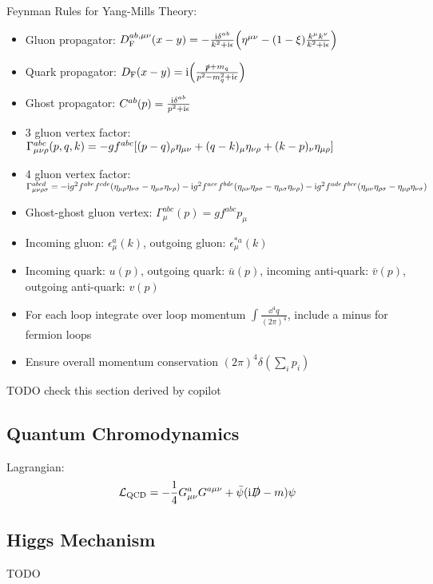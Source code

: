 		\noindent
		Feynman Rules for Yang-Mills Theory:
		\begin{itemize}\itemsep -0pt
			\item Gluon propagator: $D_\text{F}^{ab,\mu\nu}(x-y) = -\frac{\mathrm{i} \delta^{ab}}{k^2+\mathrm{i}\epsilon} \qty(\eta^{\mu\nu}-(1-\xi)\frac{k^\mu k^\nu}{k^2+\mathrm{i}\epsilon} )$
			\item Quark propagator: $D_\text{F}(x-y) = \mathrm{i}\qty(\frac{\slashed{p}+m_q}{p^2-m_q^2+\mathrm{i}\epsilon})$
			\item Ghost propagator: $C^{ab}(p) = \frac{\mathrm{i}\delta^{ab}}{p^2+\mathrm{i}\epsilon}$
			\item 3 gluon vertex factor: $\Gamma^{abc}_{\mu\nu\rho}(p,q,k) = -gf^{abc} \qty[(p-q)_\rho \eta_{\mu\nu} + (q-k)_\mu \eta_{\nu\rho} + (k-p)_\nu \eta_{\mu\rho}]$
			\item 4 gluon vertex factor: $\Gamma^{abcd}_{\mu\nu\rho\sigma} = -\mathrm{i} g^2 f^{abe}f^{cde}(\eta_{\mu\rho}\eta_{\nu\sigma} - \eta_{\mu\sigma}\eta_{\nu\rho}) - \mathrm{i} g^2 f^{ace}f^{bde} (\eta_{\mu\nu}\eta_{\rho\sigma} - \eta_{\mu\sigma}\eta_{\nu\rho}) - \mathrm{i} g^2 f^{ade} f^{bce} (\eta_{\mu\nu}\eta_{\rho\sigma} - \eta_{\mu\rho}\eta_{\nu\sigma})$
			\item Ghost-ghost gluon vertex: $\Gamma^{abc}_\mu(p) = gf^{abc} p_\mu$
			\item Incoming gluon: $\epsilon^a_\mu(k)$, outgoing gluon: $\epsilon^{*a}_\mu(k)$
			\item Incoming quark: $u(p)$, outgoing quark: $\bar{u}(p)$, incoming anti-quark: $\bar{v}(p)$, outgoing anti-quark: $v(p)$
			\item For each loop integrate over loop momentum $\int \frac{\dd^4 q}{(2\pi)^4}$, include a minus for fermion loops
			\item Ensure overall momentum conservation $(2\pi)^4 \delta(\sum_i p_i)$
		\end{itemize}
		
		TODO check this section derived by copilot
	
	\subsection{Quantum Chromodynamics} 
		Lagrangian:
		\begin{equation}
			\mathcal{L}_\text{QCD} = -\frac{1}{4} G^a_{\mu\nu} G^{a\mu\nu} + \bar{\psi}(\mathrm{i}\slashed{D}-m)\psi
		\end{equation}
		


	\subsection{Higgs Mechanism} TODO

